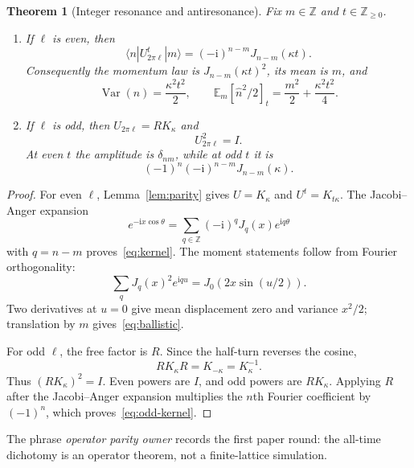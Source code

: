 \documentclass[10pt]{article}
\newtheorem{theorem}{Theorem}
\newcommand{\ZZ}{\mathbb Z}
\newcommand{\EE}{\mathbb E}
\newcommand{\opn}{\widehat n}
\newcommand{\ii}{\mathrm i}
\begin{document}
\begin{theorem}[Integer resonance and antiresonance]\label{thm:main}
Fix $m\in\ZZ$ and $t\in\ZZ_{\geq0}$.
\begin{enumerate}
\item If $\ell$ is even, then
\begin{equation}\label{eq:kernel}
 \langle n|U_{2\pi\ell}^{t}|m\rangle
 =(-\ii)^{n-m}J_{n-m}(\kappa t).
\end{equation}
Consequently the momentum law is $J_{n-m}(\kappa t)^2$, its mean is $m$,
and
\begin{equation}\label{eq:ballistic}
 \operatorname{Var}(n)=\frac{\kappa^2t^2}{2},\qquad
 \EE_m[\opn^2/2]_t
 =\frac{m^2}{2}+\frac{\kappa^2t^2}{4}.
\end{equation}
\item If $\ell$ is odd, then $U_{2\pi\ell}=RK_\kappa$ and
\begin{equation}\label{eq:involution}
 U_{2\pi\ell}^{2}=I.
\end{equation}
At even $t$ the amplitude is $\delta_{nm}$, while at odd $t$ it is
\begin{equation}\label{eq:odd-kernel}
 (-1)^n(-\ii)^{n-m}J_{n-m}(\kappa).
\end{equation}
\end{enumerate}
\end{theorem}

\begin{proof}
For even $\ell$, Lemma~\ref{lem:parity} gives $U=K_\kappa$ and
$U^t=K_{t\kappa}$.  The Jacobi--Anger expansion
\[
 e^{-\ii x\cos\theta}
 =\sum_{q\in\ZZ}(-\ii)^qJ_q(x)e^{\ii q\theta}
\]
with $q=n-m$ proves~\eqref{eq:kernel}.  The moment statements follow from
Fourier orthogonality:
\[
 \sum_q J_q(x)^2e^{\ii qu}=J_0\!(2x\sin(u/2)).
\]
Two derivatives at $u=0$ give mean displacement zero and variance $x^2/2$;
translation by $m$ gives~\eqref{eq:ballistic}.

For odd $\ell$, the free factor is $R$.  Since the half-turn reverses the
cosine,
\[
 RK_\kappa R=K_{-\kappa}=K_\kappa^{-1}.
\]
Thus $(RK_\kappa)^2=I$.  Even powers are $I$, and odd powers are $RK_\kappa$.
Applying $R$ after the Jacobi--Anger expansion multiplies the $n$th Fourier
coefficient by $(-1)^n$, which proves~\eqref{eq:odd-kernel}.
\end{proof}

The phrase \emph{operator parity owner} records the first paper round: the
all-time dichotomy is an operator theorem, not a finite-lattice simulation.
\end{document}
